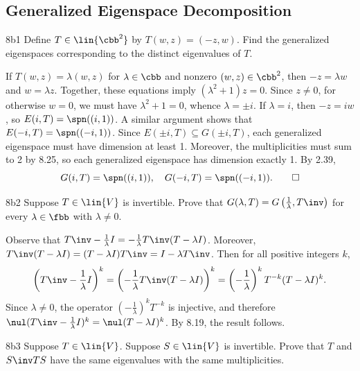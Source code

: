 \subsection{Generalized Eigenspace Decomposition}

\begin{exercise}{8b1}
    Define $T \in \lin{\cbb^2}$ by $T(w, z) = (-z, w)$.
    Find the generalized eigenspaces corresponding to the distinct eigenvalues of $T$.
\end{exercise}

\begin{sol}
    If $T(w, z) = \lambda(w, z)$ for $\lambda \in \cbb$ and nonzero $(w, z) \in \cbb^2$, then $-z = \lambda w$ and $w = \lambda z$.
    Together, these equations imply $(\lambda^2 + 1)z = 0$.
    Since $z \neq 0$, for otherwise $w = 0$, we must have $\lambda^2 + 1 = 0$, whence $\lambda = \pm i$.
    If $\lambda = i$, then $-z = i w$, so $E(i, T) = \spn((i, 1))$.
    A similar argument shows that $E(-i, T) = \spn((-i, 1))$.
    Since $E(\pm i, T) \subseteq G(\pm i, T)$, each generalized eigenspace must have dimension at least 1.
    Moreover, the multiplicities must sum to 2 by 8.25, so each generalized eigenspace has dimension exactly 1.
    By 2.39,
    \[
        G(i, T) = \spn((i, 1)), \quad G(-i, T) = \spn((-i, 1)). \qedhere
    \]
\end{sol}

\begin{exercise}{8b2}
    Suppose $T \in \lin{V}$ is invertible.
    Prove that $G(\lambda, T) = G\left(\tfrac{1}{\lambda}, T\inv\right)$ for every $\lambda \in \fbb$ with $\lambda \neq 0$.
\end{exercise}

\begin{sol}
    Observe that $T\inv - \frac{1}{\lambda} I = -\frac{1}{\lambda} T\inv (T - \lambda I)$.
    Moreover, $T\inv(T - \lambda I) = (T - \lambda I)T\inv = I - \lambda T\inv$.
    Then for all positive integers $k$,
    \[
        \left(T\inv - \frac{1}{\lambda} I\right)^k = \left(-\frac{1}{\lambda} T\inv (T - \lambda I)\right)^k = \left(-\frac{1}{\lambda}\right)^k T^{-k} (T - \lambda I)^k.
    \]
    Since $\lambda \neq 0$, the operator $(-\frac{1}{\lambda})^k T^{-k}$ is injective, and therefore $\nul(T\inv - \frac{1}{\lambda} I)^k = \nul(T - \lambda I)^k$.
    By 8.19, the result follows.
\end{sol}

\begin{exercise}{8b3}
    Suppose $T \in \lin{V}$.
    Suppose $S \in \lin{V}$ is invertible.
    Prove that $T$ and $S\inv TS$ have the same eigenvalues with the same multiplicities.
\end{exercise}

